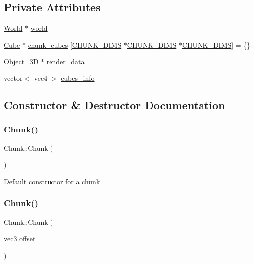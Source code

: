 \subsection*{Private Attributes}
\begin{DoxyCompactItemize}
\item 
\mbox{\hyperlink{classWorld}{World}} $\ast$ \mbox{\hyperlink{classChunk_aba16bedd07d267d54c85b3c57cd6ca31}{world}}
\item 
\mbox{\hyperlink{classCube}{Cube}} $\ast$ \mbox{\hyperlink{classChunk_aaf87542e059f3c86960e6f7b5b568daf}{chunk\+\_\+cubes}} \mbox{[}\mbox{\hyperlink{World_8hpp_a0e16b82054c4942f52ca2e1254dcc420}{C\+H\+U\+N\+K\+\_\+\+D\+I\+MS}} $\ast$\mbox{\hyperlink{World_8hpp_a0e16b82054c4942f52ca2e1254dcc420}{C\+H\+U\+N\+K\+\_\+\+D\+I\+MS}} $\ast$\mbox{\hyperlink{World_8hpp_a0e16b82054c4942f52ca2e1254dcc420}{C\+H\+U\+N\+K\+\_\+\+D\+I\+MS}}\mbox{]} = \{\}
\item 
\mbox{\hyperlink{classObject__3D}{Object\+\_\+3D}} $\ast$ \mbox{\hyperlink{classChunk_a76087b66e157921b725b896b5b254fd0}{render\+\_\+data}}
\item 
vector$<$ vec4 $>$ \mbox{\hyperlink{classChunk_acd416e07f98045f3a15354326754cc13}{cubes\+\_\+info}}
\end{DoxyCompactItemize}


\subsection{Constructor \& Destructor Documentation}
\mbox{\label{classChunk_acc32e1562cad6664c98ee07edecdbdf9}} 
\subsubsection{\texorpdfstring{Chunk()}{Chunk()}\hspace{0.1cm}{\footnotesize\ttfamily [1/3]}}
{\footnotesize\ttfamily Chunk\+::\+Chunk (\begin{DoxyParamCaption}{ }\end{DoxyParamCaption})}

Default constructor for a chunk \mbox{\label{classChunk_ad48366bd231dc1fe236ddf38e15b40bf}} 
\subsubsection{\texorpdfstring{Chunk()}{Chunk()}\hspace{0.1cm}{\footnotesize\ttfamily [2/3]}}
{\footnotesize\ttfamily Chunk\+::\+Chunk (\begin{DoxyParamCaption}\item[{vec3}]{offset }\end{DoxyParamCaption})}

